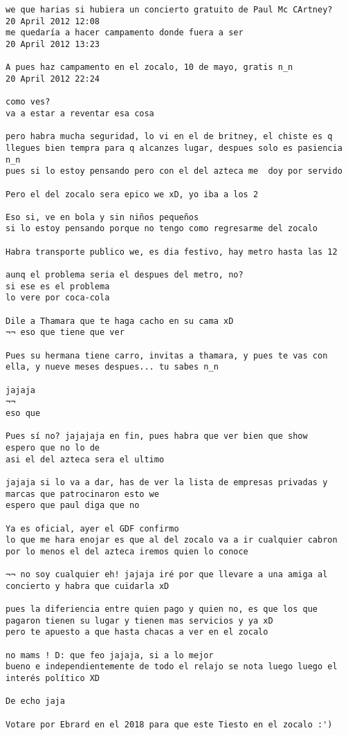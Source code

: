 \begin{verbatim}
we que harias si hubiera un concierto gratuito de Paul Mc CArtney?
20 April 2012 12:08
me quedaría a hacer campamento donde fuera a ser
20 April 2012 13:23

A pues haz campamento en el zocalo, 10 de mayo, gratis n_n
20 April 2012 22:24

como ves?
va a estar a reventar esa cosa

pero habra mucha seguridad, lo vi en el de britney, el chiste es q llegues bien tempra para q alcanzes lugar, despues solo es pasiencia n_n
pues si lo estoy pensando pero con el del azteca me  doy por servido

Pero el del zocalo sera epico we xD, yo iba a los 2

Eso si, ve en bola y sin niños pequeños
si lo estoy pensando porque no tengo como regresarme del zocalo

Habra transporte publico we, es dia festivo, hay metro hasta las 12

aunq el problema seria el despues del metro, no?
si ese es el problema
lo vere por coca-cola

Dile a Thamara que te haga cacho en su cama xD
¬¬ eso que tiene que ver

Pues su hermana tiene carro, invitas a thamara, y pues te vas con ella, y nueve meses despues... tu sabes n_n

jajaja
¬¬
eso que

Pues sí no? jajajaja en fin, pues habra que ver bien que show
espero que no lo de
asi el del azteca sera el ultimo

jajaja si lo va a dar, has de ver la lista de empresas privadas y marcas que patrocinaron esto we
espero que paul diga que no

Ya es oficial, ayer el GDF confirmo
lo que me hara enojar es que al del zocalo va a ir cualquier cabron
por lo menos el del azteca iremos quien lo conoce

¬¬ no soy cualquier eh! jajaja iré por que llevare a una amiga al concierto y habra que cuidarla xD

pues la diferiencia entre quien pago y quien no, es que los que pagaron tienen su lugar y tienen mas servicios y ya xD
pero te apuesto a que hasta chacas a ver en el zocalo

no mams ! D: que feo jajaja, si a lo mejor
bueno e independientemente de todo el relajo se nota luego luego el interés político XD

De echo jaja

Votare por Ebrard en el 2018 para que este Tiesto en el zocalo :')


\end{verbatim}
